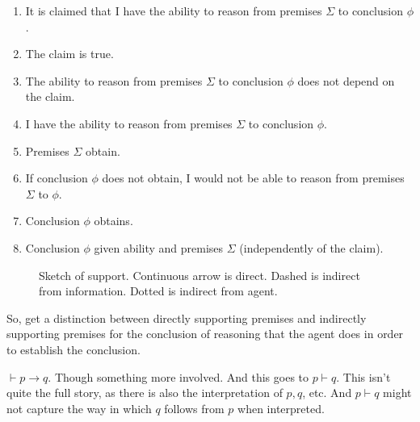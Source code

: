 \documentclass[10pt]{article}
\begin{document}
\begin{enumerate}
\item It is claimed that I have the ability to reason from premises \(\Sigma\) to conclusion \(\phi\).
\item The claim is true.
\item The ability to reason from premises \(\Sigma\) to conclusion \(\phi\) does not depend on the claim.
\item I have the ability to reason from premises \(\Sigma\) to conclusion \(\phi\).
\item Premises \(\Sigma\) obtain.
\item If conclusion \(\phi\) does not obtain, I would not be able to reason from premises \(\Sigma\) to \(\phi\).
\item Conclusion \(\phi\) obtains.
\item Conclusion \(\phi\) given ability and premises \(\Sigma\) (independently of the claim).
\end{enumerate}

\begin{figure}[h]
  \centering
\caption{Sketch of support.
  Continuous arrow is direct.
  Dashed is indirect from information.
  Dotted is indirect from agent.}
\label{fig:dynamics}
\end{figure}

So, get a distinction between directly supporting premises and indirectly supporting premises for the conclusion of reasoning that the agent does in order to establish the conclusion.

\begin{note}
  \(\vdash p \rightarrow q\).
  Though something more involved.
  And this goes to \(p \vdash q\).
  This isn't quite the full story, as there is also the interpretation of \(p, q\), etc.
  And \(p \vdash q\) might not capture the way in which \(q\) follows from \(p\) when interpreted.
\end{note}
\end{document}
